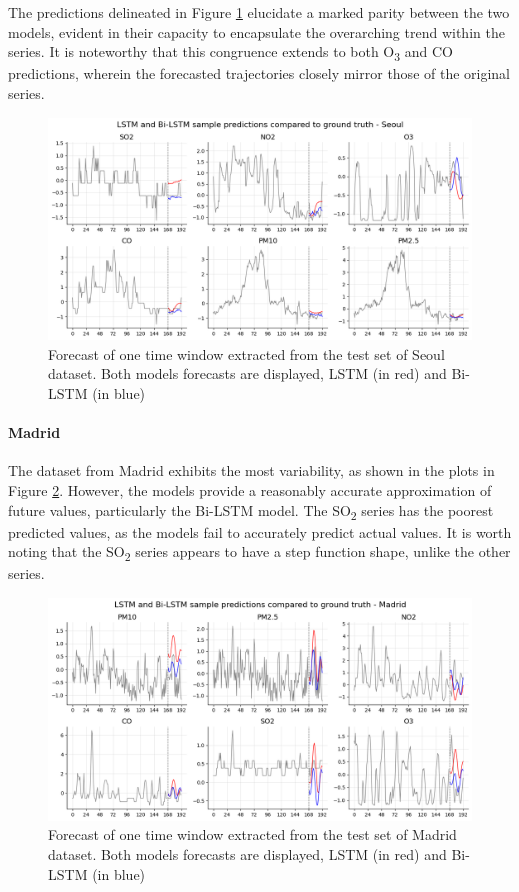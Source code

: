 The predictions delineated in Figure \ref{fig:forecasts_seoul} elucidate a marked parity between the two models, evident in their capacity to encapsulate the overarching trend within the series. It is noteworthy that this congruence extends to both O\textsubscript{3} and CO predictions, wherein the forecasted trajectories closely mirror those of the original series.

\begin{figure}[h]
    \centering
    \includegraphics[width=1\linewidth]{images/forecasts_seoul.png}
    \caption{Forecast of one time window extracted from the test set of Seoul dataset. Both models forecasts are displayed, LSTM (in red) and Bi-LSTM (in blue)}
    \label{fig:forecasts_seoul}
\end{figure}

\paragraph{Madrid}
The dataset from Madrid exhibits the most variability, as shown in the plots in Figure \ref{fig:forecasts_Madrid}. However, the models provide a reasonably accurate approximation of future values, particularly the Bi-LSTM model. The SO\textsubscript{2} series has the poorest predicted values, as the models fail to accurately predict actual values. It is worth noting that the SO\textsubscript{2} series appears to have a step function shape, unlike the other series.

\begin{figure}[h]
    \centering
    \includegraphics[width=1\linewidth]{images/forecasts_madrid.png}
    \caption{Forecast of one time window extracted from the test set of Madrid dataset. Both models forecasts are displayed, LSTM (in red) and Bi-LSTM (in blue)}
    \label{fig:forecasts_Madrid}
\end{figure}

